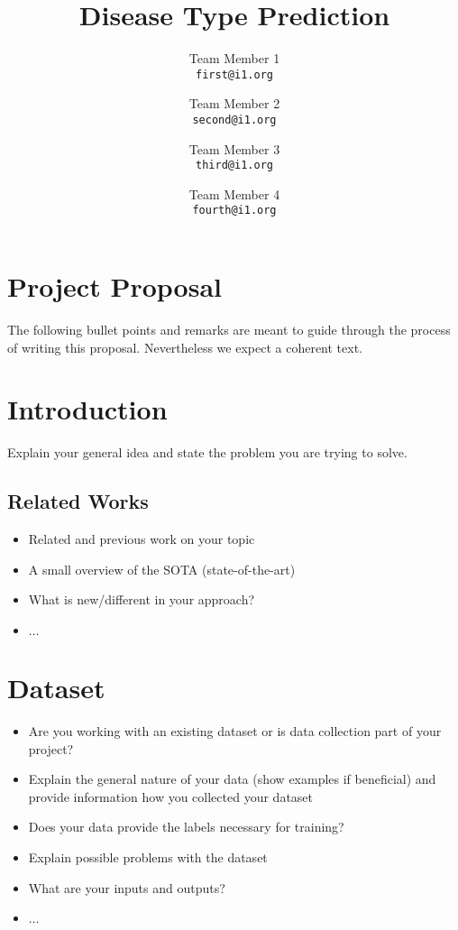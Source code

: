 \documentclass[10pt,twocolumn,letterpaper]{article}
\begin{document}
\title{Disease Type Prediction}

\author{Team Member 1\\
{\tt\small first@i1.org}
\and
Team Member 2\\
{\tt\small second@i1.org}
\and
Team Member 3\\
{\tt\small third@i1.org}
\and
Team Member 4\\
{\tt\small fourth@i1.org}
}


\maketitle

%
%
\section*{Project Proposal}
The following bullet points and remarks are meant to guide through the process of writing this proposal. Nevertheless we expect a coherent text.

\section{Introduction}
    Explain your general idea and state the problem you are trying to solve.

    \subsection{Related Works}
        \begin{itemize}
            \item Related and previous work on your topic
            \item A small overview of the SOTA (state-of-the-art)
            \item What is new/different in your approach?
            \item $\dots$
        \end{itemize}

\section{Dataset}
    \begin{itemize}
        \item Are you working with an existing dataset or is data collection part of your project?
        \item Explain the general nature of your data (show examples if beneficial) and provide information how you collected your dataset
        \item Does your data provide the labels necessary for training?
        \item Explain possible problems with the dataset
        \item What are your inputs and outputs?
        \item $\dots$
    \end{itemize}
\end{document}

